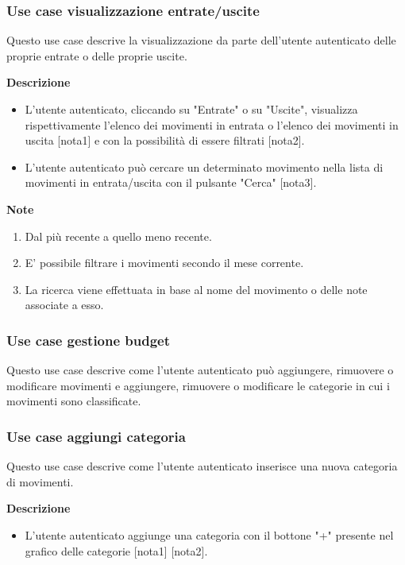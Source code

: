 \documentclass[a4paper,12pt]{article}
\begin{document}
\subsubsection*{Use case visualizzazione entrate/uscite}

Questo use case descrive la visualizzazione da parte dell'utente autenticato delle proprie entrate o delle proprie uscite.

\textbf{Descrizione}
\begin{itemize} \setlength\itemsep{0.01em}
\item L'utente autenticato, cliccando su "Entrate" o su "Uscite", visualizza rispettivamente l'elenco dei movimenti in entrata o l'elenco dei movimenti in uscita [nota1] e con la possibilità di essere filtrati [nota2].
\item L'utente autenticato può cercare un determinato movimento nella lista di movimenti in entrata/uscita con il pulsante "Cerca" [nota3].
\end{itemize}

\textbf{Note}
\begin{enumerate} \setlength\itemsep{0.01em}
\item Dal più recente a quello meno recente.
\item E' possibile filtrare i movimenti secondo il mese corrente.
\item La ricerca viene effettuata in base al nome del movimento o delle note associate a esso.
\end{enumerate}




\subsubsection*{Use case gestione budget}

Questo use case descrive come l'utente autenticato può aggiungere, rimuovere o modificare movimenti e aggiungere, rimuovere o modificare le categorie in cui i movimenti sono classificate.


\subsubsection*{Use case aggiungi categoria}

Questo use case descrive come l'utente autenticato inserisce una nuova categoria di movimenti.

\textbf{Descrizione}
\begin{itemize} \setlength\itemsep{0.01em}
\item L'utente autenticato aggiunge una categoria con il bottone "+" presente nel grafico delle categorie [nota1] [nota2].
\end{itemize}
\end{document}
